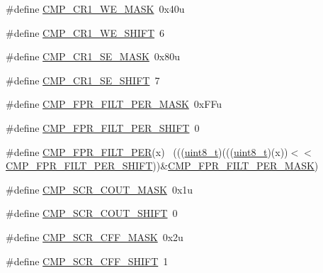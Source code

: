 \begin{DoxyCompactItemize}
\item 
\#define \hyperlink{group___c_m_p___register___masks_ga70bc3069a7e105b59d01d83b4d1714b1}{C\+M\+P\+\_\+\+C\+R1\+\_\+\+W\+E\+\_\+\+M\+A\+SK}~0x40u
\item 
\#define \hyperlink{group___c_m_p___register___masks_ga386bf7ca4f7eb8faa4ba8346620667f2}{C\+M\+P\+\_\+\+C\+R1\+\_\+\+W\+E\+\_\+\+S\+H\+I\+FT}~6
\item 
\#define \hyperlink{group___c_m_p___register___masks_ga899d139651dd67746e73452ff19e892b}{C\+M\+P\+\_\+\+C\+R1\+\_\+\+S\+E\+\_\+\+M\+A\+SK}~0x80u
\item 
\#define \hyperlink{group___c_m_p___register___masks_ga57cd3f81d8844d4e0509f342ae5170bb}{C\+M\+P\+\_\+\+C\+R1\+\_\+\+S\+E\+\_\+\+S\+H\+I\+FT}~7
\item 
\#define \hyperlink{group___c_m_p___register___masks_gaf8ca758656c156ecadfbb6f9e57a3eef}{C\+M\+P\+\_\+\+F\+P\+R\+\_\+\+F\+I\+L\+T\+\_\+\+P\+E\+R\+\_\+\+M\+A\+SK}~0x\+F\+Fu
\item 
\#define \hyperlink{group___c_m_p___register___masks_gaa563be7a82c0c1e3802e7ac7c920bf3a}{C\+M\+P\+\_\+\+F\+P\+R\+\_\+\+F\+I\+L\+T\+\_\+\+P\+E\+R\+\_\+\+S\+H\+I\+FT}~0
\item 
\#define \hyperlink{group___c_m_p___register___masks_ga64552c5393c5361b4e87fae0df10308e}{C\+M\+P\+\_\+\+F\+P\+R\+\_\+\+F\+I\+L\+T\+\_\+\+P\+ER}(x)                                        ~(((\hyperlink{_p_e___types_8h_aba7bc1797add20fe3efdf37ced1182c5}{uint8\+\_\+t})(((\hyperlink{_p_e___types_8h_aba7bc1797add20fe3efdf37ced1182c5}{uint8\+\_\+t})(x))$<$$<$\hyperlink{group___c_m_p___register___masks_gaa563be7a82c0c1e3802e7ac7c920bf3a}{C\+M\+P\+\_\+\+F\+P\+R\+\_\+\+F\+I\+L\+T\+\_\+\+P\+E\+R\+\_\+\+S\+H\+I\+FT}))\&\hyperlink{group___c_m_p___register___masks_gaf8ca758656c156ecadfbb6f9e57a3eef}{C\+M\+P\+\_\+\+F\+P\+R\+\_\+\+F\+I\+L\+T\+\_\+\+P\+E\+R\+\_\+\+M\+A\+SK})
\item 
\#define \hyperlink{group___c_m_p___register___masks_ga024aec72a28ecdc04a1441cd7a3af23a}{C\+M\+P\+\_\+\+S\+C\+R\+\_\+\+C\+O\+U\+T\+\_\+\+M\+A\+SK}~0x1u
\item 
\#define \hyperlink{group___c_m_p___register___masks_gaa508076192a6b9aed5c4d46282c64394}{C\+M\+P\+\_\+\+S\+C\+R\+\_\+\+C\+O\+U\+T\+\_\+\+S\+H\+I\+FT}~0
\item 
\#define \hyperlink{group___c_m_p___register___masks_gaab44e3da0576b12dd809881323944a1c}{C\+M\+P\+\_\+\+S\+C\+R\+\_\+\+C\+F\+F\+\_\+\+M\+A\+SK}~0x2u
\item 
\#define \hyperlink{group___c_m_p___register___masks_ga076d455f0d5bdad02282cbcce6e04c01}{C\+M\+P\+\_\+\+S\+C\+R\+\_\+\+C\+F\+F\+\_\+\+S\+H\+I\+FT}~1
$$
\end{DoxyCompactItemize}
